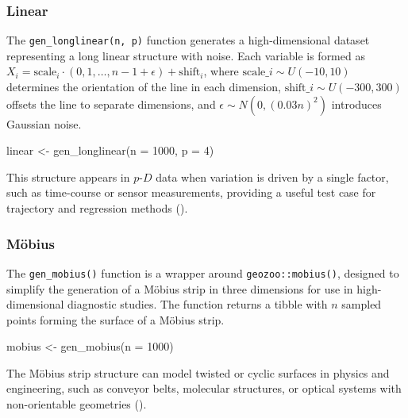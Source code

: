 \documentclass[
  11pt,
  a4paper,
]{report}
\newenvironment{Shaded}{\begin{snugshade}}{\end{snugshade}}
\newcommand{\AttributeTok}[1]{\textcolor[rgb]{0.40,0.45,0.13}{#1}}
\newcommand{\DecValTok}[1]{\textcolor[rgb]{0.68,0.00,0.00}{#1}}
\newcommand{\FunctionTok}[1]{\textcolor[rgb]{0.28,0.35,0.67}{#1}}
\newcommand{\NormalTok}[1]{\textcolor[rgb]{0.00,0.23,0.31}{#1}}
\newcommand{\OtherTok}[1]{\textcolor[rgb]{0.00,0.23,0.31}{#1}}
\newcommand\pD{$p\text{-}D$}
\begin{document}
\subsubsection{Linear}\label{linear}

The \texttt{gen\_longlinear(n,\ p)} function generates a
high-dimensional dataset representing a long linear structure with
noise. Each variable is formed as
\(X_i = \text{scale}_i \cdot (0,1,\dots,n{-}1 + \epsilon) + \text{shift}_i\),
where \(\text{scale}\_i \sim U(-10, 10)\) determines the orientation of
the line in each dimension, \(\text{shift}\_i \sim U(-300, 300)\)
offsets the line to separate dimensions, and
\(\epsilon \sim N(0, (0.03n)^2)\) introduces Gaussian noise.

\begin{Shaded}
\begin{Highlighting}[]
\NormalTok{linear }\OtherTok{\textless{}{-}} \FunctionTok{gen\_longlinear}\NormalTok{(}\AttributeTok{n =} \DecValTok{1000}\NormalTok{, }\AttributeTok{p =} \DecValTok{4}\NormalTok{)}
\end{Highlighting}
\end{Shaded}

This structure appears in \pD{} data when variation is driven by a
single factor, such as time-course or sensor measurements, providing a
useful test case for trajectory and regression methods
().

\subsubsection{Möbius}\label{muxf6bius}

The \texttt{gen\_mobius()} function is a wrapper around
\texttt{geozoo::mobius()}, designed to simplify the generation of a
Möbius strip in three dimensions for use in high-dimensional diagnostic
studies. The function returns a tibble with \(n\) sampled points forming
the surface of a Möbius strip.

\begin{Shaded}
\begin{Highlighting}[]
\NormalTok{mobius }\OtherTok{\textless{}{-}} \FunctionTok{gen\_mobius}\NormalTok{(}\AttributeTok{n =} \DecValTok{1000}\NormalTok{)}
\end{Highlighting}
\end{Shaded}

The Möbius strip structure can model twisted or cyclic surfaces in
physics and engineering, such as conveyor belts, molecular structures,
or optical systems with non-orientable geometries
().
\end{document}
